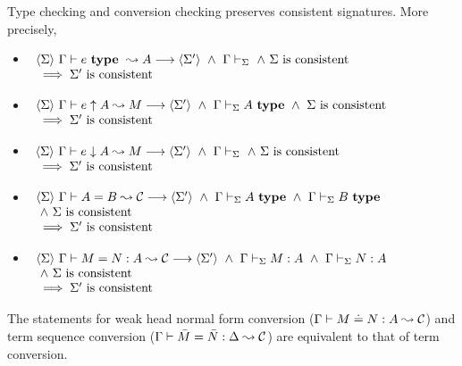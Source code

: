 \begin{lemma} \label{lemTypeCheckConsistent}
Type checking and conversion checking preserves consistent signatures. More precisely,
    \begin{itemize}

	\item
	    $\begin{array}[t]{l}
		\langle {\Sigma} \rangle ~ {{\Gamma} \vdash {e} ~ \mathbf{type} ~ \leadsto {A}} \longrightarrow \langle {\Sigma'} \rangle
		~ \wedge ~ {\Gamma} \vdash_{\Sigma}
		~ \wedge ~ \mbox{$\Sigma$ is consistent}
		\\ {} \implies \mbox{$\Sigma'$ is consistent}
	    \end{array}$

	\item
	    $\begin{array}[t]{l}
		\langle {\Sigma} \rangle ~ {{\Gamma} \vdash {e} \uparrow {A} \leadsto {M}} \longrightarrow \langle {\Sigma'} \rangle
		~ \wedge ~ {\Gamma} \vdash_{\Sigma}A ~ \mathbf{type}
		~ \wedge ~ \mbox{$\Sigma$ is consistent}
		\\ {} \implies \mbox{$\Sigma'$ is consistent}
	    \end{array}$

	\item
	    $\begin{array}[t]{l}
		\langle {\Sigma} \rangle ~ {{\Gamma} \vdash {e} \downarrow {A} \leadsto {M}} \longrightarrow \langle {\Sigma'} \rangle
		~ \wedge ~ {\Gamma} \vdash_{\Sigma}
		~ \wedge ~ \mbox{$\Sigma$ is consistent}
		\\ {} \implies \mbox{$\Sigma'$ is consistent}
	    \end{array}$

	\item
	    $\begin{array}[t]{l}
		\langle {\Sigma} \rangle ~ {{\Gamma} \vdash {A} = {B} \leadsto {\mathcal{C}}} \longrightarrow \langle {\Sigma'} \rangle
		~ \wedge ~ {\Gamma} \vdash_{\Sigma}A ~ \mathbf{type}
		~ \wedge ~ {\Gamma} \vdash_{\Sigma}B ~ \mathbf{type} \\
		~ \wedge ~ \mbox{$\Sigma$ is consistent}
		\\ {} \implies \mbox{$\Sigma'$ is consistent}
	    \end{array}$

	\item
	    $\begin{array}[t]{l}
		\langle {\Sigma} \rangle ~ {{\Gamma} \vdash {M} = {N} : {A} \leadsto {\mathcal{C}}} \longrightarrow \langle {\Sigma'} \rangle
		~ \wedge ~ {\Gamma} \vdash_{\Sigma} {M} : {A}
		~ \wedge ~ {\Gamma} \vdash_{\Sigma} {N} : {A} \\
		~ \wedge ~ \mbox{$\Sigma$ is consistent}
		\\ {} \implies \mbox{$\Sigma'$ is consistent}
	    \end{array}$

    \end{itemize}

    The statements for weak head normal form conversion (${\Gamma} \vdash {M} \doteq {N} : {A} \leadsto {\mathcal{C}}$) and term sequence conversion (${\Gamma} \vdash {\bar M} = {\bar N} : {\Delta} \leadsto {\mathcal{C}}$)
    are equivalent to that of term conversion.
\end{lemma}

